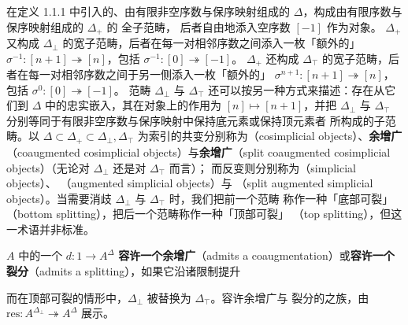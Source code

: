 \begin{definition}\label{def:split-augmented}
在定义 1.1.1 中引入的、由有限非空序数与保序映射组成的\trSimplexCategory{}
$\Delta$，构成由有限序数与保序映射组成的\trCategory{} $\Delta_{+}$ 的
全子范畴，
后者自由地添入空序数 $[-1]$ 作为\trInitial{}对象。\trCategory{} $\Delta_{+}$
又构成\trCategory{}
$\Delta_{\perp}$ 的宽子范畴，后者在每一对相邻序数之间添入一枚「额外的」
\trDegeneracyOperator{} $\sigma^{-1}\colon[n+1]\twoheadrightarrow[n]$，包括
$\sigma^{-1}\colon[0]\twoheadrightarrow[-1]$。\trCategory{} $\Delta_{+}$ 还构成\trCategory{}
$\Delta_{\top}$
的宽子范畴，后者在每一对相邻序数之间于另一侧添入一枚「额外的」
\trDegeneracyOperator{} $\sigma^{n+1}\colon[n+1]\twoheadrightarrow[n]$，包括 $\sigma^{0}\colon[0]\twoheadrightarrow[-1]$。
范畴 $\Delta_{\perp}$ 与 $\Delta_{\top}$ 还可以按另一种方式来描述：存在从它们到
$\Delta$ 中的忠实嵌入，其在对象上的作用为 $[n]\mapsto[n+1]$，并把 $\Delta_{\perp}$
与 $\Delta_{\top}$ 分别等同于有限非空序数与保序映射中保持底元素或保持顶元素者
所构成的子范畴。以 $\Delta\subset\Delta_{+}\subset\Delta_{\perp},\Delta_{\top}$
为索引的共变\trDiagram{}分别称为\textbf{\trCosimplicialObject}（cosimplicial
objects）、\textbf{余增广\trCosimplicialObject}（coaugmented cosimplicial
objects）与\textbf{\trSplit{}余增广\trCosimplicialObject}（split coaugmented
cosimplicial objects）（无论对 $\Delta_{\perp}$ 还是对 $\Delta_{\top}$ 而言）；
而反变\trDiagram{}则分别称为\textbf{\trSimplicialObject}（simplicial objects）、%
\textbf{\trAugmented{}\trSimplicialObject}（augmented simplicial objects）与%
\textbf{\trSplit{}\trAugmented{}\trSimplicialObject}（split augmented simplicial
objects）。当需要消歧 $\Delta_{\perp}$ 与 $\Delta_{\top}$ 时，我们把前一个范畴
称作一种「底部可裂」（bottom splitting），把后一个范畴称作一种「顶部可裂」
（top splitting），但这一术语并非标准。

\trInfinityCategory{} $A$ 中的一个\trCosimplicialObject{} $d\colon 1\to A^{\Delta}$
\textbf{容许一个余增广}（admits a coaugmentation）或\textbf{容许一个裂分}（admits
a splitting），如果它沿诸限制\trFunctor{}提升
\begin{center}
\end{center}
而在顶部可裂的情形中，$\Delta_{\perp}$ 被替换为 $\Delta_{\top}$。容许余增广与
裂分的\trCosimplicialObject{}之族，由\trGeneralizedElement{}
$\mathrm{res}\colon A^{\Delta_{\perp}}\twoheadrightarrow A^{\Delta}$ 展示。
\end{definition}


